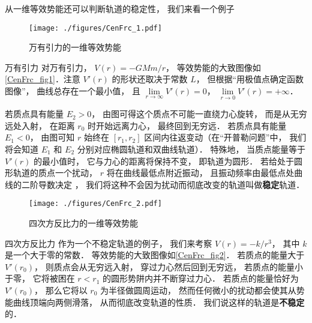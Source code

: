 从一维等效势能还可以判断轨道的稳定性， 我们来看一个例子

\begin{figure}[ht]
\centering
\texttt{[image: ./figures/CenFrc\_1.pdf]}
\caption{万有引力的一维等效势能} \label{CenFrc_fig1}
\end{figure}

\begin{example}{万有引力}
对万有引力， $V(r) = -GMm/r$， 等效势能的大致图像如\autoref{CenFrc_fig1}．注意 $V'(r)$ 的形状还取决于常数 $L$， 但根据“用极值点确定函数图像”， 曲线总存在一个最小值， 且 $\lim\limits_{r\to\infty}V'(r) = 0$， $\lim\limits_{r\to 0} V'(r) = +\infty$．

若质点具有能量 $E_2 > 0$， 由图可得这个质点不可能一直绕力心旋转， 而是从无穷远处入射， 在距离 $r_0$ 时开始远离力心， 最终回到无穷远． 若质点具有能量 $E_1 < 0$， 由图可知 $r$ 始终在 $[r_1, r_2]$ 区间内往返变动（在“开普勒问题”中， 我们将会知道 $E_1$ 和 $E_2$ 分别对应椭圆轨道和双曲线轨道）． 特殊地， 当质点能量等于 $V'(r)$ 的最小值时， 它与力心的距离将保持不变， 即轨道为圆形． 若给处于圆形轨道的质点一个扰动， $r$ 将在曲线最低点附近振动， 且振动频率由最低点处曲线的二阶导数决定%
， 我们将这种不会因为扰动而彻底改变的轨道叫做\textbf{稳定}轨道．
\end{example}

\begin{figure}[ht]
\centering
\texttt{[image: ./figures/CenFrc\_2.pdf]}
\caption{四次方反比力的一维等效势能} \label{CenFrc_fig2}
\end{figure}

\begin{example}{四次方反比力}
作为一个不稳定轨道的例子， 我们来考察 $V(r) = -k/r^3$， 其中 $k$ 是一个大于零的常数． 等效势能的大致图像如\autoref{CenFrc_fig2}． 若质点的能量大于 $V'(r_0)$， 则质点会从无穷远入射， 穿过力心然后回到无穷远， 若质点的能量小于零， 它将被困在 $r < r_1$ 的圆形势阱内并不断穿过力心． 若质点的能量恰好为 $V'(r_0)$， 那么它将以 $r_0$ 为半径做圆周运动， 然而任何微小的扰动都会使其从势能曲线顶端向两侧滑落， 从而彻底改变轨道的性质． 我们说这样的轨道是\textbf{不稳定}的．
\end{example}

